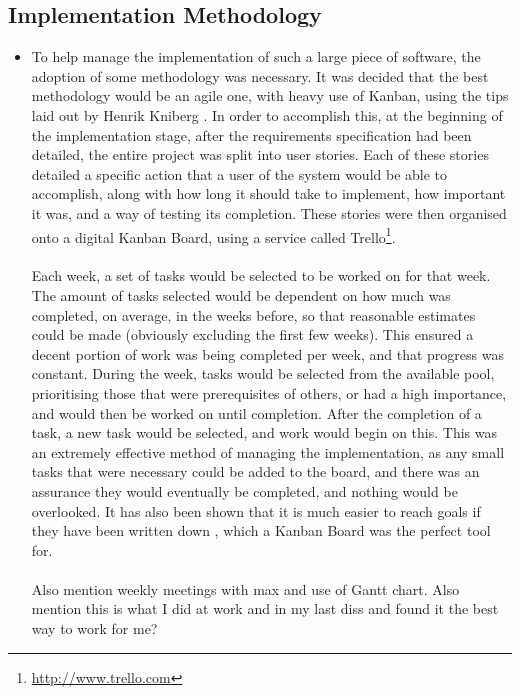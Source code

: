 \subsection{Implementation Methodology}
{\color{red}
	\begin{itemize}
		\item To help manage the implementation of such a large piece of software, the adoption of some methodology was necessary. It was decided that the best methodology would be an agile one, with heavy use of Kanban, using the tips laid out by Henrik Kniberg \cite{kniberg2007scrum}. In order to accomplish this, at the beginning of the implementation stage, after the requirements specification had been detailed, the entire project was split into user stories. Each of these stories detailed a specific action that a user of the system would be able to accomplish, along with how long it should take to implement, how important it was, and a way of testing its completion. These stories were then organised onto a digital Kanban Board, using a service called Trello\footnote{\url{http://www.trello.com}}. \ \\
		\ \\
		Each week, a set of tasks would be selected to be worked on for that week. The amount of tasks selected would be dependent on how much was completed, on average, in the weeks before, so that reasonable estimates could be made (obviously excluding the first few weeks). This ensured a decent portion of work was being completed per week, and that progress was constant. During the week, tasks would be selected from the available pool, prioritising those that were prerequisites of others, or had a high importance, and would then be worked on until completion. After the completion of a task, a new task would be selected, and work would begin on this. This was an extremely effective method of managing the implementation, as any small tasks that were necessary could be added to the board, and there was an assurance they would eventually be completed, and nothing would be overlooked. It has also been shown that it is much easier to reach goals if they have been written down \cite{wilson2008goal}, which a Kanban Board was the perfect tool for.\ \\
		\ \\
		Also mention weekly meetings with max and use of Gantt chart. Also mention this is what I did at work and in my last diss and found it the best way to work for me?
	\end{itemize}
}

